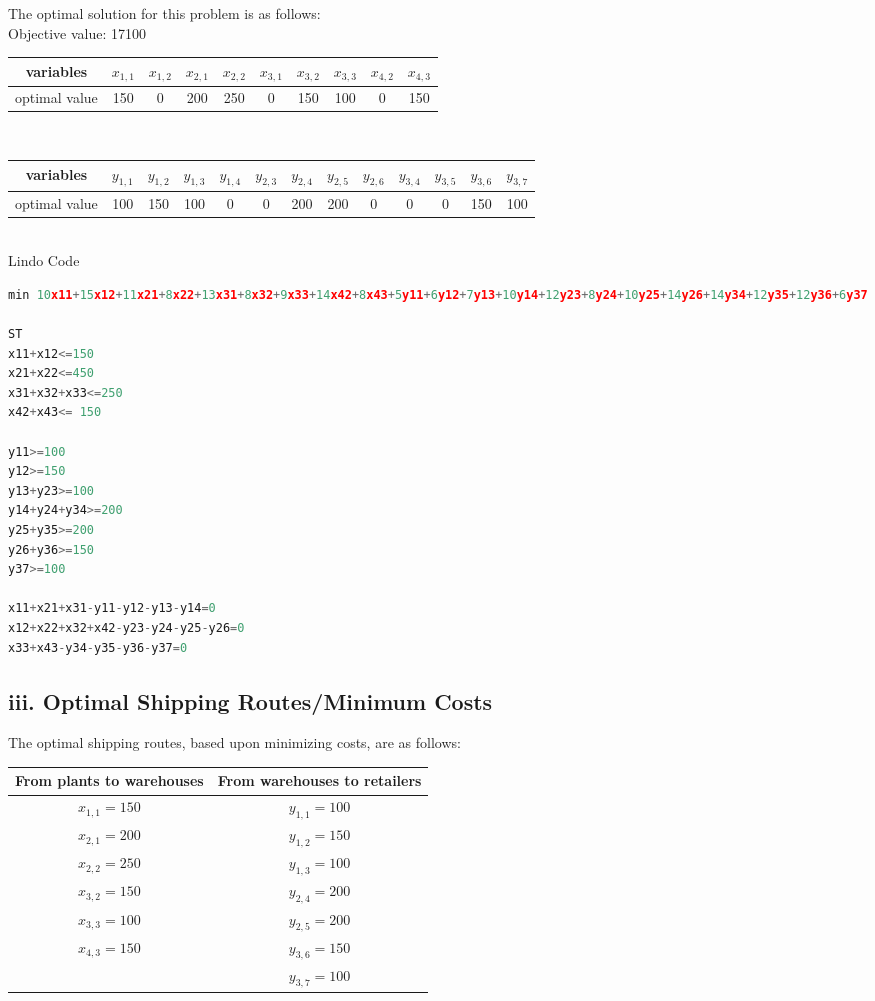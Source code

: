 \documentclass[11pt]{scrreprt}
\begin{document}
The optimal solution for this problem is as follows:\\

Objective value: 17100\\

\begin{tabular}{|c|c|c|c|c|c|c|c|c|c|}
	\hline variables & $x_{1,1}$   &  $x_{1,2}$ & $x_{2,1}$ & $x_{2,2}$ & $x_{3,1}$ & $x_{3,2}$ & $x_{3,3}$ & $x_{4,2}$ & $x_{4,3}$      \\
	\hline optimal value & 150  &  0 & 200 & 250 & 0 & 150 & 100 & 0 & 150            \\
	\hline
\end{tabular} \\

\begin{tabular}{|c|c|c|c|c|c|c|c|c|c|c|c|c|}
	\hline variables & $y_{1,1}$ & $y_{1,2}$ & $y_{1,3}$ & $y_{1,4}$ & $y_{2,3}$ & $y_{2,4}$ & $y_{2,5}$ & $y_{2,6}$ & $y_{3,4}$ & $y_{3,5}$ & $y_{3,6}$ & $y_{3,7}$  \\
	\hline optimal value & 	100 & 150 & 100 & 0 & 0 & 200 & 200 & 0 & 0 & 0 & 150 & 100 \\
	 \hline
\end{tabular} \\

Lindo Code
\begin{lstlisting}[basicstyle=\small,language=c]
min 10x11+15x12+11x21+8x22+13x31+8x32+9x33+14x42+8x43+5y11+6y12+7y13+10y14+12y23+8y24+10y25+14y26+14y34+12y35+12y36+6y37

ST
x11+x12<=150
x21+x22<=450
x31+x32+x33<=250
x42+x43<= 150

y11>=100
y12>=150
y13+y23>=100
y14+y24+y34>=200
y25+y35>=200
y26+y36>=150
y37>=100

x11+x21+x31-y11-y12-y13-y14=0
x12+x22+x32+x42-y23-y24-y25-y26=0
x33+x43-y34-y35-y36-y37=0
\end{lstlisting}

\subsection{iii. Optimal Shipping Routes/Minimum Costs}
The optimal shipping routes, based upon minimizing costs, are as follows: \\

\begin{tabular}{|c|c|}
	\hline From plants to warehouses & From warehouses to retailers \\
	\hline $x_{1,1} = 150$ & $y_{1,1} = 100$ \\
	\hline $x_{2,1} = 200$ &$y_{1,2} = 150$ \\
	\hline $x_{2,2} = 250$ &$y_{1,3} = 100$ \\
	\hline $x_{3,2} = 150$ &$y_{2,4} = 200$ \\
	\hline $x_{3,3} = 100$ & $y_{2,5} = 200$  \\
	\hline $x_{4,3} = 150$ & $y_{3,6} = 150$  \\
	\hline & $y_{3,7} = 100$ \\
	\hline
\end{tabular} \\
\end{document}
